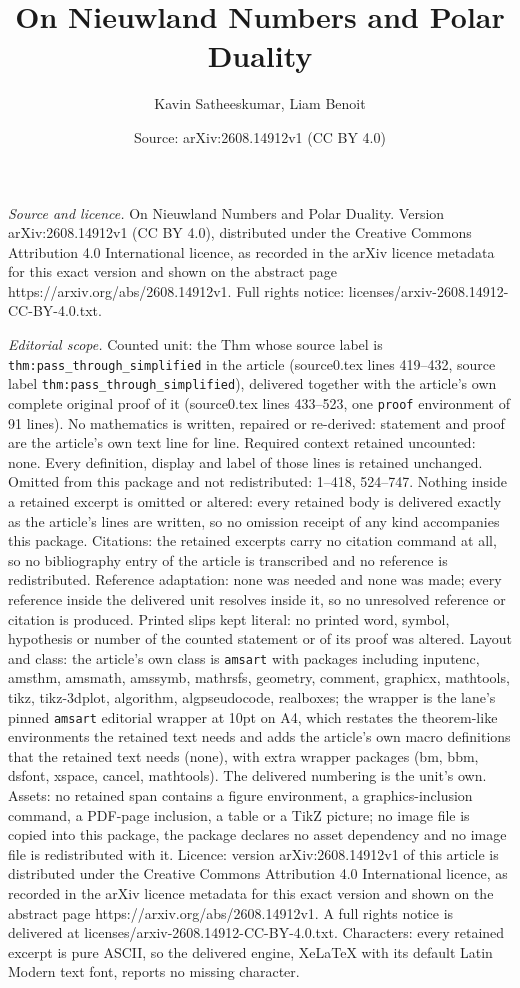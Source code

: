 \documentclass[10pt,a4paper]{amsart}
\title[On Nieuwland Numbers and Polar Duality]{On Nieuwland Numbers and Polar Duality}
\author{Kavin Satheeskumar, Liam Benoit}
\date{Source: arXiv:2608.14912v1 (CC BY 4.0)}
\begin{document}
\maketitle

\noindent\emph{Source and licence.} On Nieuwland Numbers and Polar Duality. Version arXiv:2608.14912v1 (CC BY 4.0), distributed under the Creative Commons Attribution 4.0 International licence, as recorded in the arXiv licence metadata for this exact version and shown on the abstract page https://arxiv.org/abs/2608.14912v1. Full rights notice: licenses/arxiv-2608.14912-CC-BY-4.0.txt.\par\smallskip

\noindent\textit{Editorial scope.} Counted unit: the Thm whose source label is \texttt{thm:pass\_through\_simplified} in the article (source0.tex lines 419--432, source label \texttt{thm:pass\_through\_simplified}), delivered together with the article's own complete original proof of it (source0.tex lines 433--523, one \texttt{proof} environment of 91 lines). No mathematics is written, repaired or re-derived: statement and proof are the article's own text line for line. Required context retained uncounted: none. Every definition, display and label of those lines is retained unchanged. Omitted from this package and not redistributed: 1--418, 524--747. Nothing inside a retained excerpt is omitted or altered: every retained body is delivered exactly as the article's lines are written, so no omission receipt of any kind accompanies this package. Citations: the retained excerpts carry no citation command at all, so no bibliography entry of the article is transcribed and no reference is redistributed. Reference adaptation: none was needed and none was made; every reference inside the delivered unit resolves inside it, so no unresolved reference or citation is produced. Printed slips kept literal: no printed word, symbol, hypothesis or number of the counted statement or of its proof was altered. Layout and class: the article's own class is \texttt{amsart} with packages including inputenc, amsthm, amsmath, amssymb, mathrsfs, geometry, comment, graphicx, mathtools, tikz, tikz-3dplot, algorithm, algpseudocode, realboxes; the wrapper is the lane's pinned \texttt{amsart} editorial wrapper at 10pt on A4, which restates the theorem-like environments the retained text needs and adds the article's own macro definitions that the retained text needs (none), with extra wrapper packages (bm, bbm, dsfont, xspace, cancel, mathtools). The delivered numbering is the unit's own. Assets: no retained span contains a figure environment, a graphics-inclusion command, a PDF-page inclusion, a table or a TikZ picture; no image file is copied into this package, the package declares no asset dependency and no image file is redistributed with it. Licence: version arXiv:2608.14912v1 of this article is distributed under the Creative Commons Attribution 4.0 International licence, as recorded in the arXiv licence metadata for this exact version and shown on the abstract page https://arxiv.org/abs/2608.14912v1. A full rights notice is delivered at licenses/arxiv-2608.14912-CC-BY-4.0.txt. Characters: every retained excerpt is pure ASCII, so the delivered engine, XeLaTeX with its default Latin Modern text font, reports no missing character.
\end{document}
